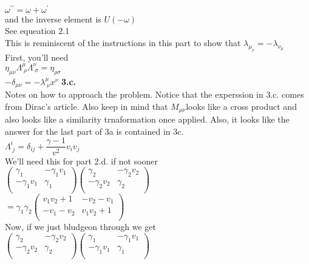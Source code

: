 \documentclass[prb,preprint]
{revtex4-1}
\begin{document}
\\
$\omega^{\prime\prime} = \omega + \omega^\prime$
\\
and the inverse element is 
$U\left(-\omega\right)$
\\
See equeation 2.1
\\
This is reminiscent of the instructions in this part to show that $\lambda_{\mu_\nu} = -\lambda_{\nu_\mu}$
\\
First, you'll need 
\\
$\eta_{\mu\nu} \Lambda^\mu_{\;\rho} \Lambda^\nu_{\;\sigma} = \eta_{\rho\sigma}$
\\
$-\delta_{\mu\nu} = -\lambda^\mu_{\;\nu} x^\nu$
\textbf{3.c.}
\\
Notes on how to approach the problem.  Notice that the experssion in 3.c. comes from Dirac's article.  Also keep in mind that $M_{\mu\nu}$looks like a cross product and also looks like a similarity trnaformation once applied.  Also, it looks like the answer for the last part of 3a is contained in 3c. 
\\
$\Lambda^i_{\; j} = \delta_{ij} + \dfrac{\gamma - 1}{v^2} v_i v_j$
\\
We'll need this for part 2.d. if not sooner
\\
$\begin{pmatrix}
\gamma_1 & -\gamma_1 v_1\\
-\gamma_1 v_1 & \gamma_1\\
\end{pmatrix} 
\begin{pmatrix}
\gamma_2 & -\gamma_2 v_2\\
-\gamma_2 v_2 & \gamma_2\\
\end{pmatrix} $
\\
$  = \gamma_1 \gamma_2 
\begin{pmatrix}
v_1 v_2 + 1 & -v_2 - v_1\\
-v_1 - v_2 & v_1 v_2 + 1\\
\end{pmatrix} $
\\
Now, if we just bludgeon through we get
\\
$\begin{pmatrix}
\gamma_2 & -\gamma_2 v_2\\
-\gamma_2 v_2 & \gamma_2\\
\end{pmatrix} 
\begin{pmatrix}
\gamma_1 & -\gamma_1 v_1\\
-\gamma_1 v_1 & \gamma_1\\
\end{pmatrix} $
\end{document}
